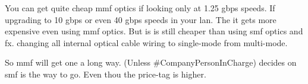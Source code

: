 You can get quite cheap \gls{mmf} optics if looking only at 1.25 \gls{gbps} speeds. If upgrading to 10 \gls{gbps} or even 40 \gls{gbps} speeds in your \gls{lan}. The it gets more expensive even using \gls{mmf} optics. But is is still cheaper than using \gls{smf} optics and fx. changing all internal optical cable wiring to single-mode from multi-mode.

So \gls{mmf} will get one a long way. (Unless \#CompanyPersonInCharge) decides on \gls{smf} is the way to go. Even thou the price-tag is higher.
